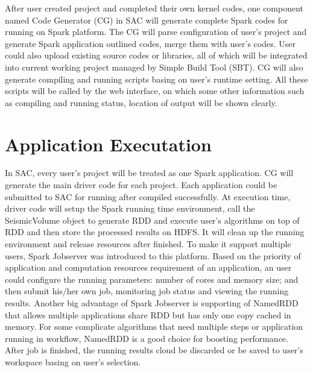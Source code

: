 After user created project and completed their own kernel codes, one component named Code Generator (CG) in SAC will generate complete Spark codes for running on Spark platform. The CG will parse configuration of user's project and generate Spark application outlined codes, merge them with user's codes. User could also upload existing source codes or libraries, all of which will be integrated into current working project managed by Simple Build Tool (SBT). CG will also generate compiling and running scripts basing on user's runtime setting. All these scripts will be called by the web interface, on which some other information such as compiling and running status, location of output will be shown clearly.

\section{Application Executation}

In SAC, every user's project will be treated as one Spark application. CG will generate the main driver code for each project. Each application could be submitted to SAC for running after compiled successfully. At execution time, driver code will setup the Spark running time environment, call the SeismicVolume object to generate RDD and execute user's algorithms on top of RDD and then store the processed results on HDFS. It will clean up the running environment and release resources after finished. To make it support multiple users, Spark Jobserver \cite{}  was introduced to this platform. Based on the priority of application and computation resources requirement of an application, an user could configure the running parameters: number of cores and memory size; and then submit his/her own job, monitoring job status and viewing the running results. Another big advantage of Spark Jobserver is supporting of NamedRDD that allows multiple applications share RDD but has only one copy cached in memory. For some complicate algorithms that need multiple steps or application running in workflow, NamedRDD is a good choice for boosting performance. After job is finished, the running results cloud be discarded or be saved to user's workspace basing on user's selection.

